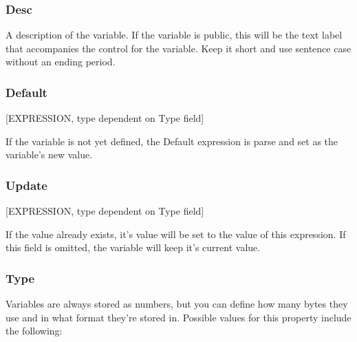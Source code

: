 \documentclass[12pt,a4paper,notitlepage]{article}
\begin{document}
\subsubsection{Desc}
A description of the variable. If the variable is public, this will be the text label that accompanies the control for the variable. Keep it short and use sentence case without an ending period.

\subsubsection{Default}
[EXPRESSION, type dependent on Type field]

If the variable is not yet defined, the Default expression is parse and set as the variable's new value.

\subsubsection{Update}
[EXPRESSION, type dependent on Type field]

If the value already exists, it's value will be set to the value of this expression. If this field is omitted, the variable will keep it's current value.

\subsubsection{Type}
\label{subsubsec:create-var-type}
Variables are always stored as numbers, but you can define how many bytes they use and in what format they're stored in. Possible values for this property include the following:
\end{document}
